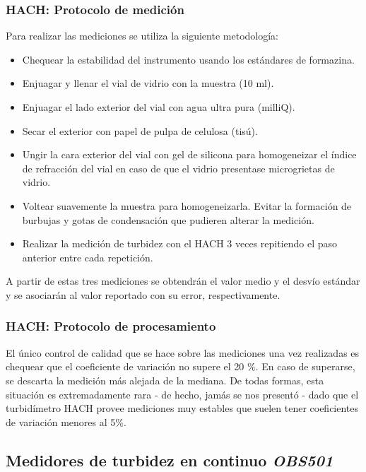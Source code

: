         \subsubsection{HACH: Protocolo de medición}
        \label{dat:s:hachMed}

            Para realizar las mediciones se utiliza la siguiente metodología:
            \begin{itemize}
                \item Chequear la estabilidad del instrumento usando los estándares de formazina.
                \item Enjuagar y llenar el vial de vidrio con la muestra (10 ml).
                \item Enjuagar el lado exterior del vial con agua ultra pura (milliQ).
                \item Secar el exterior con papel de pulpa de celulosa (tisú).
                \item Ungir la cara exterior del vial con gel de silicona para homogeneizar el índice de refracción del vial en caso de que el vidrio presentase microgrietas de vidrio.
                \item Voltear suavemente la muestra para homogeneizarla. Evitar la formación de burbujas y gotas de condensación que pudieren alterar la medición.
                \item Realizar la medición de turbidez con el HACH 3 veces repitiendo el paso anterior entre cada repetición.
            \end{itemize}
            A partir de estas tres mediciones se obtendrán el valor medio y el desvío estándar y se asociarán al valor reportado con su error, respectivamente.

        \subsubsection{HACH: Protocolo de procesamiento}
        \label{dat:s:hachProc}
        
            El único control de calidad que se hace sobre las mediciones una vez realizadas es chequear que el coeficiente de variación no supere el 20 \%. En caso de superarse, se descarta la medición más alejada de la mediana. De todas formas, esta situación es extremadamente rara - de hecho, jamás se nos presentó - dado que el turbidímetro HACH provee mediciones muy estables que suelen tener coeficientes de variación menores al 5\%.
    
    \subsection{Medidores de turbidez en continuo \textit{OBS501}}
    \label{dat:s:obs}
    
